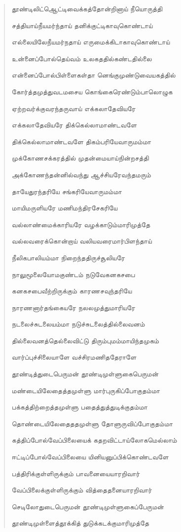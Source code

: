 \documentclass{article}
\begin{document}
\begin{quotation}
{தூண்டிலிட்ஆெட்டிவைக்கத்தோன்றினாய் நீயொருத்தி

சத்தியாய்நீயமர்ந்தாய் தனிக்குட்டிகாவுகொண்டாய்

எல்லையிலேநீயமர்நதாய் எருமைக்கிடாகாவுகொண்டாய்

உன்னைப்போல்தெய்வம் உலகததில்கண்டதில்லை

என்னைப்போல்பிள்ளைகள்தா னெங்குமுண்டுவையகத்தில்

கோர்த்தமுத்துவடமசைய கொங்கைரெண்டும்பாலொழுக

ஏற்றவர்க்குவரந்தருவாய் எக்கலாதேவியரே

எக்கலாதேவியரே திக்கெல்லாமாண்டவளே

திக்கெல்லாமாண்டவளே திகம்பரியேவாருமம்மா

முக்கோணசக்கரத்தில் முதன்மையாய்நின்றசத்தி

அக்கோணந்தன்னில்வந்து ஆச்சியரேவந்தமரும்

தாயேதுரந்தரியே சங்கரியேவாருமம்மா

மாயிமருளியரே மணிமந்திரசேகரியே

வல்லாண்மைக்காரியரே வழக்காடும்மாரிமுத்தே

வல்லவரைக்கொன்றாய் வலியவரைமார்பிளந்தாய்

நீலிகபாலியம்மா நிறைந்ததிருச்சூலியரே

நாலுமூலையோமகுண்டம் நடுவேகனகசபை

கனகசபைவீற்றிருக்கும் காரணசவுந்தரியே

நாரணனார்தங்கையரே நலலமுத்துமாரியரே

நடலைச்சுடலையம்மா நடுச்சுடலைத்தில்லைவனம்

தில்லைவனத்தெல்லைவிட்டு திரும்புமம்மாயிந்தமுகம்

வார்ப்புச்சிலையாளே வச்சிரமணிததேராளே

தூண்டித்துடைபெருமன் தூண்டிமுள்ளுகைபெருமன்

மண்டையிலேதைத்தமுள்ளு மார்புருகிப்போகுதம்மா

பக்கத்திற்றைத்தமுள்ளு பதைத்துத்துடிக்குதம்மா

தொண்டையிலேதைததமுள்ளு தோளுருவிப்போகுதம்மா

கத்திப்போல்வேப்பிலையைக் கதறவிட்டாய்லோகமெல்லாம்

ஈட்டிப்போல்வேப்பிலையை யினியனுப்பிக்கொண்டவளே

பத்திரிக்குள்ளிருக்கும் பாவனையையாரறிவார்

வேப்பிலைக்குள்ளிருக்கும் வித்தைதனையாரறிவார்

செடிலோதுடைபெருமன் தூண்டிமுள்ளுகைப்பேருமன்

தூண்டிமுள்ளைத்தூக்கித் துடுக்கடக்குமாரிமுத்தே

}
\end{quotation}
\end{document}
